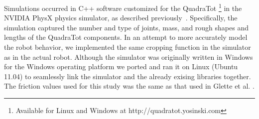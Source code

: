 Simulations occurred in C++ software customized for the QuadraTot \footnote{Available for Linux and Windows at http://quadratot.yosinski.com} in the NVIDIA PhysX physics simulator, as described previously~\cite{glette}. 
Specifically, the simulation captured the number and type of joints, mass, and rough shapes and lengths of the QuadraTot components. 
In an attempt to more accurately model the robot behavior, we implemented the same cropping function in the simulator as in the actual robot. %
Although the simulator was originally written in Windows for the Windows operating platform we ported and ran it on Linux (Ubuntu 11.04) to seamlessly link the simulator and the already exising libraries together. 
The friction values used for this study was the same as that used in Glette et al. \cite{glette}. 
%
%

